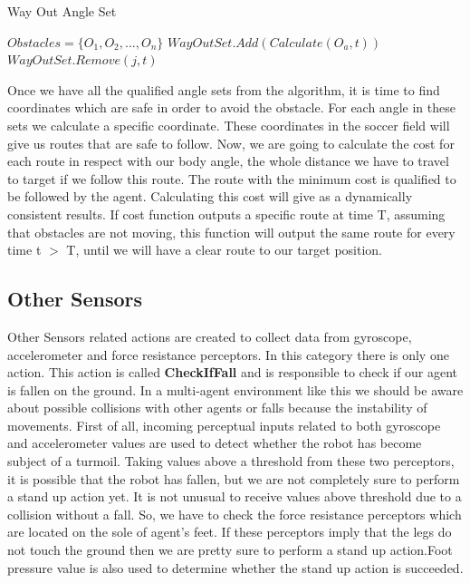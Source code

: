 \begin{algorithm}[htb!]
\caption{Way Out Angle Set}
\label{alg2}
\begin{algorithmic}[1]
\STATE $Obstacles = \lbrace O_{1},O_{2},...,O_{n} \rbrace $
\STATE $WayOutSet.Add(Calculate(O_{a},t))$
\ENDFOR
{}
\STATE $WayOutSet.Remove(j,t)$
\ENDIF
\ENDFOR
\ENDFOR
\end{algorithmic}
\end{algorithm}
Once we have all the qualified angle sets from the algorithm, it is time to find coordinates which are safe in order to avoid the obstacle. For each angle in these sets we calculate a specific coordinate. These coordinates in the soccer field will give us routes that are safe to follow. Now, we are going to calculate the cost for each route in respect with our body angle, the whole distance we have to travel to target if we follow this route. The route with the minimum cost is qualified to be followed by the agent. Calculating this cost will give as a dynamically consistent results. If cost function outputs a specific route at time T, assuming that obstacles are not moving, this function will output the same route for every time t $>$ T, until we will have a clear route to our target position.


\subsection{Other Sensors}
Other Sensors related actions are created to collect data from gyroscope, accelerometer and force resistance perceptors. In this category there is only one action. This action is called {\bf CheckIfFall} and is responsible to check if our agent is fallen on the ground. In a multi-agent environment like this we should be aware about possible collisions with other agents or falls because the instability of movements. First of all, incoming perceptual inputs related to both gyroscope and accelerometer values are used to detect whether the robot has become subject of a turmoil. Taking values  above a threshold from these two perceptors, it is possible that the robot has fallen, but we are not completely sure to perform a stand up action yet. It is not unusual to receive values above threshold due to a collision without a fall. So, we have to check the force resistance perceptors which are located on the sole of agent's feet. If these perceptors imply that the legs do not touch the ground then we are pretty sure to perform a stand up action.Foot pressure value is also used to determine whether the stand up action is succeeded.


